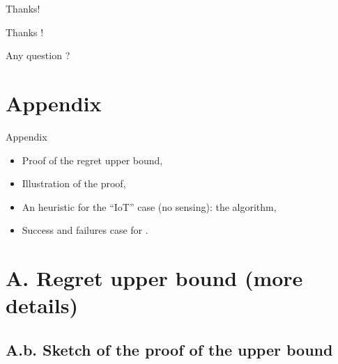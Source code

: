 \documentclass[12pt,english,ignorenonframetext,]{beamer}
\newcommand{\Fontify}{}
\providecommand{\tightlist}{%
  \setlength{\itemsep}{0pt}\setlength{\parskip}{0pt}}
\begin{document}
\begin{frame}{Thanks!}

\begin{center}\begin{Huge}
  {\Fontify Thanks !}
  \Smiley[0.9]
\end{Huge}\end{center}

\vspace*{20pt}

\begin{center}\begin{Huge}
  {\Fontify Any question ?}
\end{Huge}\end{center}

\end{frame}


\appendix{}


\section{\hfill{}Appendix\hfill{}}

\begin{frame}{Appendix}

\begin{itemize}\tightlist
\item
  Proof of the regret upper bound,
\item
  Illustration of the proof,
\item
  An heuristic for the ``IoT'' case (no sensing): the \Selfish{} algorithm,
\item
  Success and failures case for \Selfish{}.
\end{itemize}

\end{frame}


\section{\hfill{}A. Regret upper bound (more details)\hfill{}}

\subsection{\hfill{}A.b. Sketch of the proof of the upper bound\hfill{}}
\end{document}
